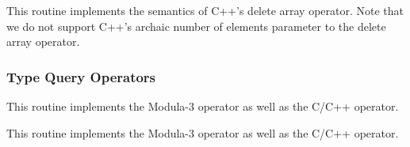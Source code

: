 \begin{functionality}
This routine implements the semantics of C++'s delete array operator.
Note that we do not support C++'s archaic number of elements parameter
to the delete array operator.
\end{functionality}


\subsubsection{Type Query Operators}
\begin{functionality}
This routine implements the Modula-3  operator as well as the
C/C++  operator.
\end{functionality}
\begin{functionality}
This routine implements the Modula-3  operator as well as the
C/C++  operator.
\end{functionality}
\begin{functionality}
\modulaOp
\end{functionality}
\begin{functionality}
\modulaOp
\end{functionality}
\begin{functionality}
\modulaOp
\end{functionality}
\begin{functionality}
\modulaOp
\end{functionality}

